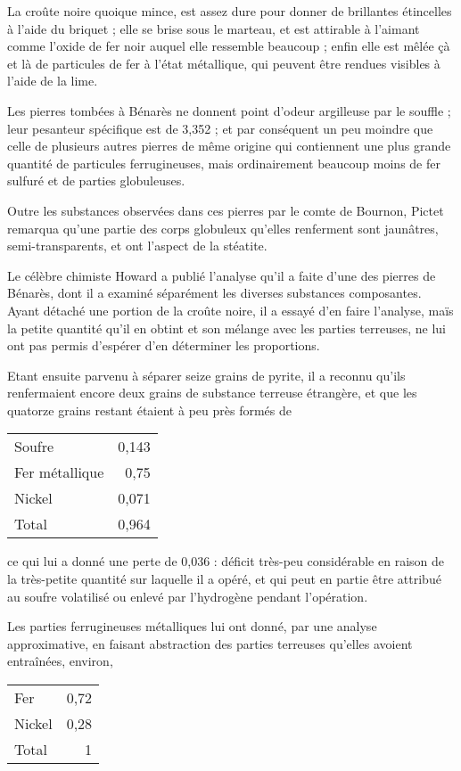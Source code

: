 \documentclass[a4paper, 12pt, oneside, french]{article}
\begin{document}
La croûte noire quoique mince, est assez dure pour donner de brillantes étincelles à l'aide du briquet ; elle se brise sous le marteau, et est attirable à l'aimant comme l'oxide de fer noir auquel elle ressemble beaucoup ; enfin elle est mêlée çà et là de particules de fer à l'état métallique, qui peuvent être rendues visibles à l'aide de la lime.

Les pierres tombées à Bénarès ne donnent point d'odeur argilleuse par le souffle ; leur pesanteur spécifique est de 3,352 ; et par conséquent un peu moindre que celle de plusieurs autres pierres de même origine qui contiennent une plus grande quantité de particules ferrugineuses, mais ordinairement beaucoup moins de fer sulfuré et de parties globuleuses.

Outre les substances observées dans ces pierres par le comte de Bournon, Pictet remarqua qu'une partie des corps globuleux qu'elles renferment sont jaunâtres, semi-transparents, et ont l'aspect de la stéatite.

Le célèbre chimiste Howard a publié l'analyse qu'il a faite d'une des pierres de Bénarès, dont il a examiné séparément les diverses substances composantes. Ayant détaché une portion de la croûte noire, il a essayé d'en faire l'analyse, maïs la petite quantité qu'il en obtint et son mélange avec les parties terreuses, ne lui ont pas permis d'espérer d'en déterminer les proportions.

Etant ensuite parvenu à séparer seize grains de pyrite, il a reconnu qu'ils renfermaient encore deux grains de substance terreuse étrangère, et que les quatorze grains restant étaient à peu près formés de
\begin{table}[H]
    \centering
    \Fontauri
    \large
    \begin{tabular}{l r}
        Soufre & 0,143 \\
        Fer métallique & 0,75 \\
        Nickel & 0,071 \\ \hline
        Total & 0,964 \\
    \end{tabular}
\end{table}
ce qui lui a donné une perte de 0,036 : déficit très-peu considérable en raison de la très-petite quantité sur laquelle il a opéré, et qui peut en partie être attribué au soufre volatilisé ou enlevé par l'hydrogène pendant l'opération.

Les parties ferrugineuses métalliques lui ont donné, par une analyse approximative, en faisant abstraction des parties terreuses qu'elles avoient entraînées, environ,
\begin{table}[H]
    \centering
    \Fontauri
    \large
    \begin{tabular}{l r}
        Fer & 0,72 \\
        Nickel & 0,28 \\ \hline
        Total & 1 \\
    \end{tabular}
\end{table}
\end{document}
